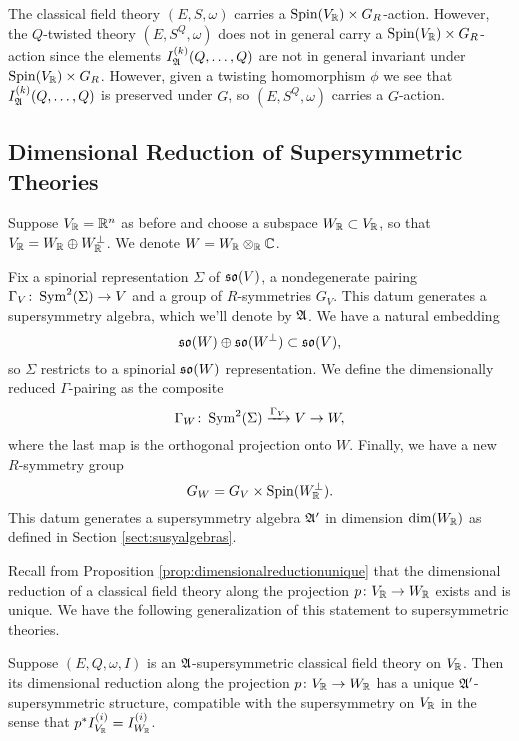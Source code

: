 \documentclass[10pt, oneside]{article}
\begin{document}
The classical field theory $(E, S, \omega)$ carries a $\mathrm{Spin}(V_\mathbb R)\times G_R$-action. However, the $Q$-twisted theory $(E, S^Q, \omega)$ does not in general carry a $\mathrm{Spin}(V_\mathbb R)\times G_R$-action since the elements $I_{\mathfrak A}^{(k)}(Q, \dots, Q)$ are not in general invariant under $\mathrm{Spin}(V_\mathbb R)\times G_R$. However, given a twisting homomorphism $\phi$ we see that $I_{\mathfrak A}^{(k)}(Q, \dots, Q)$ is preserved under $G$, so $(E, S^Q, \omega)$ carries a $G$-action.

\subsection{Dimensional Reduction of Supersymmetric Theories}

Suppose $V_\mathbb R=\mathbb R^n$ as before and choose a subspace $W_\mathbb R\subset V_\mathbb R$, so that $V_\mathbb R = W_\mathbb R\oplus W^\perp_\mathbb R$. We denote $W=W_{\mathbb R}\otimes_{\mathbb R} \mathbb C$.

Fix a spinorial representation $\Sigma$ of $\mathfrak{so}(V)$, a nondegenerate pairing $\Gamma_V\colon \operatorname{Sym}^2(\Sigma)\rightarrow V$ and a group of $R$-symmetries $G_V$.  This datum generates a supersymmetry algebra, which we'll denote by $\mathfrak{A}$.  We have a natural embedding
\[\mathfrak{so}(W)\oplus \mathfrak{so}(W^{\perp})\subset \mathfrak{so}(V),\]
so $\Sigma$ restricts to a spinorial $\mathfrak{so}(W)$ representation. We define the dimensionally reduced $\Gamma$-pairing as the composite
\[\Gamma_W\colon \operatorname{Sym}^2(\Sigma)\xrightarrow{\Gamma_V} V\rightarrow W,\]
where the last map is the orthogonal projection onto $W$. Finally, we have a new $R$-symmetry group
\[G_W = G_V\times \mathrm{Spin}(W^\perp_\mathbb R).\]
This datum generates a supersymmetry algebra $\mathfrak{A}'$ in dimension $\mathrm{dim}(W_\mathbb R)$ as defined in Section \ref{sect:susyalgebras}.

Recall from Proposition \ref{prop:dimensionalreductionunique} that the dimensional reduction of a classical field theory along the projection $p\colon V_\mathbb R\rightarrow W_\mathbb R$ exists and is unique. We have the following generalization of this statement to supersymmetric theories.

\begin{prop} \label{prop:susydimlred}
Suppose $(E, Q, \omega, I)$ is an $\mathfrak{A}$-supersymmetric classical field theory on $V_\mathbb R$. Then its dimensional reduction along the projection $p\colon V_\mathbb R\rightarrow W_\mathbb R$ has a unique $\mathfrak{A}'$-supersymmetric structure, compatible with the supersymmetry on $V_\mathbb R$ in the sense that $p^*I^{(i)}_{V_\mathbb R} = I^{(i)}_{W_\mathbb R}$.
\end{prop}
\end{document}

